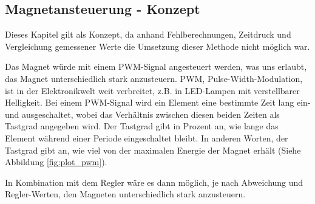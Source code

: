 \subsection{Magnetansteuerung - Konzept} \label{cap:methoden_magnetansteuerung}
Dieses Kapitel gilt als Konzept, da anhand Fehlberechnungen, Zeitdruck und Vergleichung gemessener Werte die Umsetzung dieser Methode nicht möglich war.
\newpara

Das Magnet würde mit einem PWM-Signal angesteuert werden, was uns erlaubt, das Magnet unterschiedlich stark anzusteuern. PWM, Pulse-Width-Modulation, ist in der Elektronikwelt weit verbreitet, z.B. in LED-Lampen mit verstellbarer Helligkeit. Bei einem PWM-Signal wird ein Element eine bestimmte Zeit lang ein- und ausgeschaltet, wobei das Verhältnis zwischen diesen beiden Zeiten als Tastgrad angegeben wird. Der Tastgrad gibt in Prozent an, wie lange das Element während einer Periode eingeschaltet bleibt. In anderen Worten, der Tastgrad gibt an, wie viel von der maximalen Energie der Magnet erhält (Siehe Abbildung \ref{fig:plot_pwm}).
\newpara

\newpara
In Kombination mit dem Regler wäre es dann möglich, je nach Abweichung und Regler-Werten, den Magneten unterschiedlich stark anzusteuern.